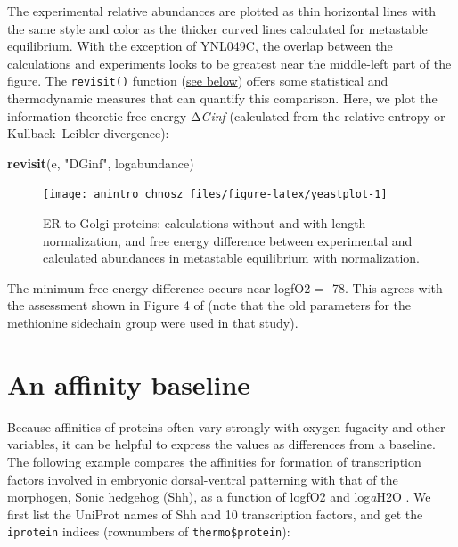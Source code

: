 \documentclass[]{tufte-book}
\newenvironment{Shaded}{}{}
\newcommand{\KeywordTok}[1]{\textcolor[rgb]{0.00,0.44,0.13}{\textbf{#1}}}
\newcommand{\StringTok}[1]{\textcolor[rgb]{0.25,0.44,0.63}{#1}}
\newcommand{\NormalTok}[1]{#1}
\begin{document}
The experimental relative abundances are plotted as thin horizontal
lines with the same style and color as the thicker curved lines
calculated for metastable equilibrium. With the exception of YNL049C,
the overlap between the calculations and experiments looks to be
greatest near the middle-left part of the figure. The
{\texttt{revisit()}} function
(\protect\hyperlink{optimization-of-chemical-activities}{see below})
offers some statistical and thermodynamic measures that can quantify
this comparison. Here, we plot the information-theoretic free energy
Δ\emph{Ginf} (calculated from the relative entropy or Kullback--Leibler
divergence):

\begin{Shaded}
\begin{Highlighting}[]
\KeywordTok{revisit}\NormalTok{(e, }\StringTok{"DGinf"}\NormalTok{, logabundance)}
\end{Highlighting}
\end{Shaded}

\begin{figure}
\texttt{[image: anintro\_chnosz\_files/figure-latex/yeastplot-1]} \caption[ER-to-Golgi proteins]{ER-to-Golgi proteins: calculations without and with length normalization, and free energy difference between experimental and calculated abundances in metastable equilibrium with normalization.}\label{fig:yeastplot}
\end{figure}

The minimum free energy difference occurs near logfO2 = -78. This agrees
with the assessment shown in Figure 4 of \citet{Dic09} (note that the
old parameters for the methionine sidechain group were used in that
study).

\section{An affinity baseline}\label{an-affinity-baseline}

Because affinities of proteins often vary strongly with oxygen fugacity
and other variables, it can be helpful to express the values as
differences from a baseline. The following example compares the
affinities for formation of transcription factors involved in embryonic
dorsal-ventral patterning with that of the morphogen, Sonic hedgehog
(Shh), as a function of logfO2 and log\emph{a}H2O \citep{Dic15}. We
first list the UniProt names of Shh and 10 transcription factors, and
get the \texttt{iprotein} indices (rownumbers of
\texttt{thermo\$protein}):
\end{document}
